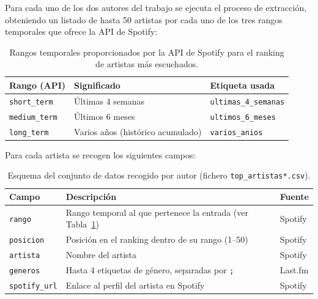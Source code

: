 Para cada uno de los dos autores del trabajo se ejecuta el proceso de extracción, obteniendo un listado de hasta 50 artistas por cada uno de los tres rangos temporales que ofrece la API de Spotify:

\begin{table}[H]
    \centering
    \renewcommand{\arraystretch}{1.5}
    \begin{tabular}{|p{}|p{}|p{}|}
        \hline
        \textbf{Rango (API)} & \textbf{Significado} & \textbf{Etiqueta usada} \\
        \hline
        \texttt{short\_term} & Últimas 4 semanas & \texttt{ultimas\_4\_semanas} \\
        \hline
        \texttt{medium\_term} & Últimos 6 meses & \texttt{ultimos\_6\_meses} \\
        \hline
        \texttt{long\_term} & Varios años (histórico acumulado) & \texttt{varios\_anios} \\
        \hline
    \end{tabular}
    \caption{Rangos temporales proporcionados por la API de Spotify para el ranking de artistas más escuchados.}
    \label{tab:rangos}
\end{table}

Para cada artista se recogen los siguientes campos:

\begin{table}[H]
    \centering
    \renewcommand{\arraystretch}{1.5}
    \begin{tabular}{|p{}|p{}|p{}|}
        \hline
        \textbf{Campo} & \textbf{Descripción} & \textbf{Fuente} \\
        \hline
        \texttt{rango} & Rango temporal al que pertenece la entrada (ver Tabla~\ref{tab:rangos}) & Spotify \\
        \hline
        \texttt{posicion} & Posición en el ranking dentro de su rango (1--50) & Spotify \\
        \hline
        \texttt{artista} & Nombre del artista & Spotify \\
        \hline
        \texttt{generos} & Hasta 4 etiquetas de género, separadas por \texttt{;} & Last.fm \\
        \hline
        \texttt{spotify\_url} & Enlace al perfil del artista en Spotify & Spotify \\
        \hline
    \end{tabular}
    \caption{Esquema del conjunto de datos recogido por autor (fichero \texttt{top\_artistas*.csv}).}
    \label{tab:esquema}
\end{table}

